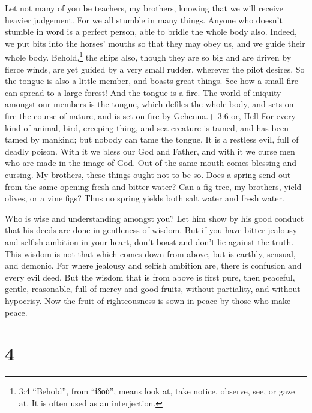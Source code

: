  Let not many of you be teachers, my brothers, knowing that
we will receive heavier judgement.  For we all stumble in
many things. Anyone who doesn't stumble in word is a perfect person,
able to bridle the whole body also.  Indeed, we put bits
into the horses' mouths so that they may obey us, and we guide their
whole body.  Behold,\footnote{3:4 ``Behold'', from ``ἰδοὺ'',
  means look at, take notice, observe, see, or gaze at. It is often used
  as an interjection.} the ships also, though they are so big and are
driven by fierce winds, are yet guided by a very small rudder, wherever
the pilot desires.  So the tongue is also a little member,
and boasts great things. See how a small fire can spread to a large
forest!  And the tongue is a fire. The world of iniquity
amongst our members is the tongue, which defiles the whole body, and
sets on fire the course of nature, and is set on fire by Gehenna.+ 3:6
or, Hell  For every kind of animal, bird, creeping thing,
and sea creature is tamed, and has been tamed by mankind; 
but nobody can tame the tongue. It is a restless evil, full of deadly
poison.  With it we bless our God and Father, and with it we
curse men who are made in the image of God.  Out of the
same mouth comes blessing and cursing. My brothers, these things ought
not to be so.  Does a spring send out from the same opening
fresh and bitter water?  Can a fig tree, my brothers, yield
olives, or a vine figs? Thus no spring yields both salt water and fresh
water.

 Who is wise and understanding amongst you? Let him show by
his good conduct that his deeds are done in gentleness of wisdom.
 But if you have bitter jealousy and selfish ambition in
your heart, don't boast and don't lie against the truth. 
This wisdom is not that which comes down from above, but is earthly,
sensual, and demonic.  For where jealousy and selfish
ambition are, there is confusion and every evil deed.  But
the wisdom that is from above is first pure, then peaceful, gentle,
reasonable, full of mercy and good fruits, without partiality, and
without hypocrisy.  Now the fruit of righteousness is sown
in peace by those who make peace.

\hypertarget{section-3}{%
\section{4}\label{section-3}}

